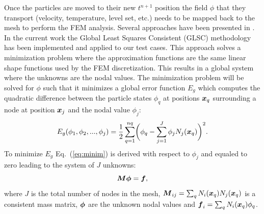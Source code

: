 Once the particles are moved to their new $t^{n+1}$ position the field $\phi$ that they transport (velocity, temperature, level set, etc.) needs to be mapped back to the mesh to perform the FEM analysis. Several approaches have been presented in \cite{gimenez:tesis}. In the current work the Global Least Squares Consistent (GLSC) methodology has been implemented and applied to our test cases. This approach solves a minimization problem where the approximation functions are the same linear shape functions used by the FEM discretization. This results in a global system where the unknowns are the nodal values. The minimization problem will be solved for $\phi$ such that it minimizes a global error function $E_g$ which computes the quadratic difference between the particle states $\phi_q$ at positions $\boldsymbol{x}_q$ surrounding a node at position $\boldsymbol{x}_j$ and the nodal value $\phi_j$:
%
\begin{equation}\label{eq:minim}
  E_g(\phi_1,\phi_2,...,\phi_j)=\frac{1}{2}\sum_{q=1}^{nq} \biggl(\phi_q-\sum_{j=1}^J\phi_jN_j(\boldsymbol{x}_q)\biggr)^2.
\end{equation}
%
To minimize $E_g$ Eq.~(\ref{eq:minim}) is derived with respect to $\phi_j$ and equaled to zero leading to the system of $J$ unknowns:
%
\begin{equation}\label{eq:mapptom}
  \boldsymbol{M}\boldsymbol{\phi}=\boldsymbol{f},
\end{equation}
%
where $J$ is the total number of nodes in the mesh, $\boldsymbol{M}_{ij}=\sum_qN_i(\boldsymbol{x}_q)N_j(\boldsymbol{x}_q)$ is a consistent mass matrix, $\boldsymbol{\phi}$ are the unknown nodal values and $\boldsymbol{f}_i=\sum_qN_i(\boldsymbol{x}_q)\phi_q$.

